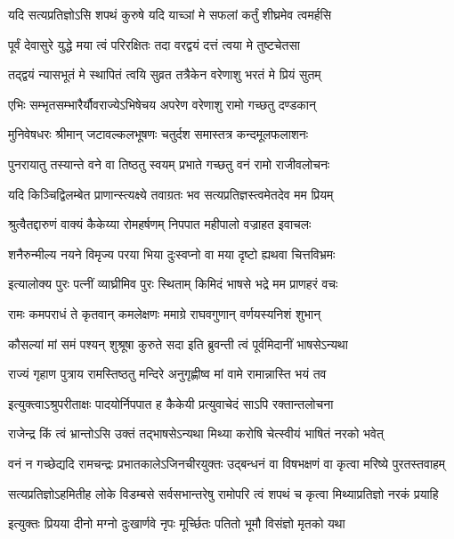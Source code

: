 \twolineshloka
{यदि सत्यप्रतिज्ञोऽसि शपथं कुरुषे यदि}
{याच्ञां मे सफलां कर्तुं शीघ्रमेव त्वमर्हसि} %

\twolineshloka
{पूर्वं देवासुरे युद्धे मया त्वं परिरक्षितः}
{तदा वरद्वयं दत्तं त्वया मे तुष्टचेतसा} %

\twolineshloka
{तद्द्वयं न्यासभूतं मे स्थापितं त्वयि सुव्रत}
{तत्रैकेन वरेणाशु भरतं मे प्रियं सुतम्} %

\twolineshloka
{एभिः सम्भृतसम्भारैर्यौवराज्येऽभिषेचय}
{अपरेण वरेणाशु रामो गच्छतु दण्डकान्} %

\twolineshloka
{मुनिवेषधरः श्रीमान् जटावल्कलभूषणः}
{चतुर्दश समास्तत्र कन्दमूलफलाशनः} %

\twolineshloka
{पुनरायातु तस्यान्ते वने वा तिष्ठतु स्वयम्}
{प्रभाते गच्छतु वनं रामो राजीवलोचनः} %

\twolineshloka
{यदि किञ्चिद्विलम्बेत प्राणान्स्त्यक्ष्ये तवाग्रतः}
{भव सत्यप्रतिज्ञस्त्वमेतदेव मम प्रियम्} %

\twolineshloka
{श्रुत्वैतद्दारुणं वाक्यं कैकेय्या रोमहर्षणम्}
{निपपात महीपालो वज्राहत इवाचलः} %

\twolineshloka
{शनैरुन्मील्य नयने विमृज्य परया भिया}
{दुःस्वप्नो वा मया दृष्टो ह्यथवा चित्तविभ्रमः} %

\twolineshloka
{इत्यालोक्य पुरः पत्नीं व्याघ्रीमिव पुरः स्थिताम्}
{किमिदं भाषसे भद्रे मम प्राणहरं वचः} %

\twolineshloka
{रामः कमपराधं ते कृतवान् कमलेक्षणः}
{ममाग्रे राघवगुणान् वर्णयस्यनिशं शुभान्} %

\twolineshloka
{कौसल्यां मां समं पश्यन् शुश्रूषा कुरुते सदा}
{इति ब्रुवन्ती त्वं पूर्वमिदानीं भाषसेऽन्यथा} %

\twolineshloka
{राज्यं गृहाण पुत्राय रामस्तिष्ठतु मन्दिरे}
{अनुगृह्णीष्व मां वामे रामान्नास्ति भयं तव} %

\twolineshloka
{इत्युक्त्वाऽश्रुपरीताक्षः पादयोर्निपपात ह}
{कैकेयी प्रत्युवाचेदं साऽपि रक्तान्तलोचना} %

\twolineshloka
{राजेन्द्र किं त्वं भ्रान्तोऽसि उक्तं तद्भाषसेऽन्यथा}
{मिथ्या करोषि चेत्स्वीयं भाषितं नरको भवेत्} %

\fourlineindentedshloka
{वनं न गच्छेद्यदि रामचन्द्रः}
{प्रभातकालेऽजिनचीरयुक्तः}
{उद्बन्धनं वा विषभक्षणं वा}
{कृत्वा मरिष्ये पुरतस्तवाहम्} %

\fourlineindentedshloka
{सत्यप्रतिज्ञोऽहमितीह लोके}
{विडम्बसे सर्वसभान्तरेषु}
{रामोपरि त्वं शपथं च कृत्वा}
{मिथ्याप्रतिज्ञो नरकं प्रयाहि} %

\twolineshloka
{इत्युक्तः प्रियया दीनो मग्नो दुःखार्णवे नृपः}
{मूर्च्छितः पतितो भूमौ विसंज्ञो मृतको यथा} %

